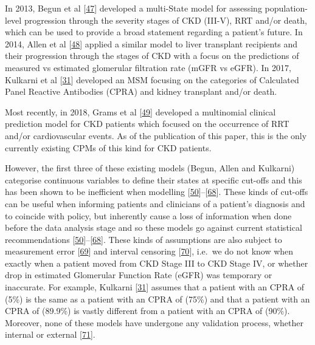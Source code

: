 \documentclass[12pt,PhD,twoside,openright]{muthesis}
\begin{document}
In 2013, Begun et al {[}\protect\hyperlink{ref-begun_identification_2013}{47}{]} developed a multi-State model for assessing population-level progression through the severity stages of CKD (III-V), RRT and/or death, which can be used to provide a broad statement regarding a patient's future. In 2014, Allen et al {[}\protect\hyperlink{ref-allen_chronic_2014}{48}{]} applied a similar model to liver transplant recipients and their progression through the stages of CKD with a focus on the predictions of measured vs estimated glomerular filtration rate (mGFR vs eGFR). In 2017, Kulkarni et al {[}\protect\hyperlink{ref-kulkarni_transition_2017}{31}{]} developed an MSM focusing on the categories of Calculated Panel Reactive Antibodies (CPRA) and kidney transplant and/or death.

Most recently, in 2018, Grams et al {[}\protect\hyperlink{ref-grams_predicting_2018}{49}{]} developed a multinomial clinical prediction model for CKD patients which focused on the occurrence of RRT and/or cardiovascular events. As of the publication of this paper, this is the only currently existing CPMs of this kind for CKD patients.

However, the first three of these existing models (Begun, Allen and Kulkarni) categorise continuous variables to define their states at specific cut-offs and this has been shown to be inefficient when modelling {[}\protect\hyperlink{ref-altman_problems_1994-1}{50}{]}--{[}\protect\hyperlink{ref-weinberg_how_1995}{68}{]}. These kinds of cut-offs can be useful when informing patients and clinicians of a patient's diagnosis and to coincide with policy, but inherently cause a loss of information when done before the data analysis stage and so these models go against current statistical recommendations {[}\protect\hyperlink{ref-altman_problems_1994-1}{50}{]}--{[}\protect\hyperlink{ref-weinberg_how_1995}{68}{]}. These kinds of assumptions are also subject to measurement error {[}\protect\hyperlink{ref-van_smeden_reflection_2019}{69}{]} and interval censoring {[}\protect\hyperlink{ref-sun_interval_2005}{70}{]}, i.e.~we do not know when exactly when a patient moved from CKD Stage III to CKD Stage IV, or whether drop in estimated Glomerular Function Rate (eGFR) was temporary or inaccurate. For example, Kulkarni {[}\protect\hyperlink{ref-kulkarni_transition_2017}{31}{]} assumes that a patient with an CPRA of (5\%) is the same as a patient with an CPRA of (75\%) and that a patient with an CPRA of (89.9\%) is vastly different from a patient with an CPRA of (90\%). Moreover, none of these models have undergone any validation process, whether internal or external {[}\protect\hyperlink{ref-altman_prognosis_2009}{71}{]}.
\end{document}
